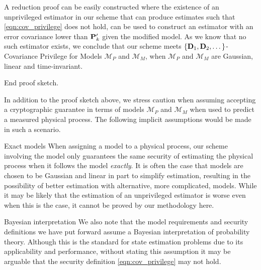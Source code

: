 \documentclass[letterpaper, 10 pt, conference]{IEEEtran}
\theoremstyle{definition}
\theoremstyle{definition}
\theoremstyle{remark}
\begin{document}
A reduction proof can be easily constructed where the existence of an unprivileged estimator in our scheme that can produce estimates such that \eqref{eqn:cov_privilege} does not hold, can be used to construct an estimator with an error covariance lower than ${{\mathbf{P}}}^\prime_k$ given the modified model. As we know that no such estimator exists, we conclude that our scheme meets $\{{{\mathbf{D}}}_1,{{\mathbf{D}}}_2,\dots\}$-Covariance Privilege for Models $\mathcal{M}_P$ and $\mathcal{M}_M$, when $\mathcal{M}_P$ and $\mathcal{M}_M$ are Gaussian, linear and time-invariant.

End proof sketch.

In addition to the proof sketch above, we stress caution when assuming accepting a cryptographic guarantee in terms of models $\mathcal{M}_P$ and $\mathcal{M}_M$ when used to predict a measured physical process. The following implicit assumptions would be made in such a scenario.
\begin{LaTeXdescription}
   \item[Exact models] When assigning a model to a physical process, our scheme involving the model only guarantees the same security of estimating the physical process when it follows the model \textit{exactly}. It is often the case that models are chosen to be Gaussian and linear in part to simplify estimation, resulting in the possibility of better estimation with alternative, more complicated, models. While it may be likely that the estimation of an unprivileged estimator is worse even when this is the case, it cannot be proved by our methodology here.
   \item[Bayesian interpretation] We also note that the model requirements and security definitions we have put forward assume a Bayesian interpretation of probability theory. Although this is the standard for state estimation problems due to its applicability and performance, without stating this assumption it may be arguable that the security definition \ref{eqn:cov_privilege} may not hold.
\end{LaTeXdescription}

% 
% 
\end{document}
